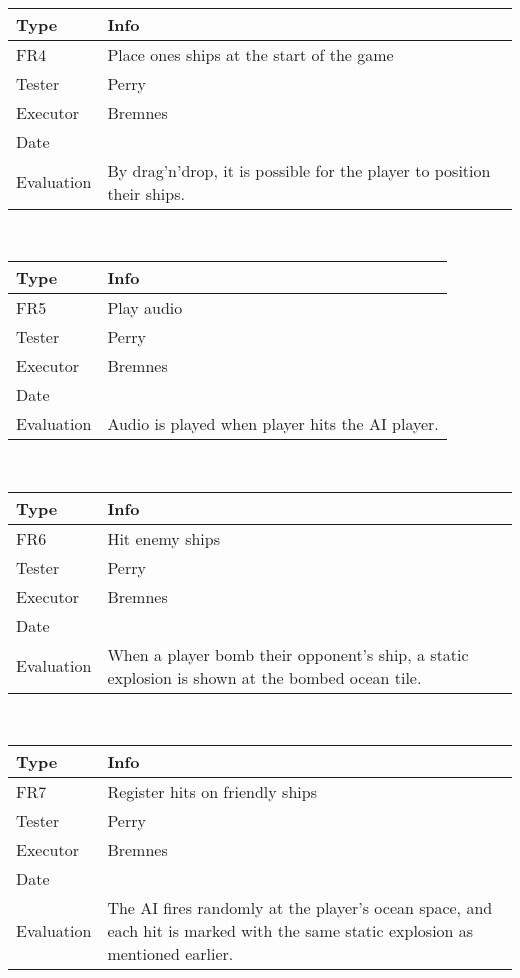 \\
\begin{tabular}{|l|l|}
	\hline
	\bf{Type}	& \bf{Info} \\
	\hline
	FR4			& Place ones ships at the start of the game \\
	Tester		& Perry \\
	Executor	& Bremnes \\
	Date		& \date{\today} \\
	Evaluation	& By drag'n'drop, it is possible for the player to position their ships. \\
	\hline
\end{tabular}
\\
\begin{tabular}{|l|l|}
	\hline
	\bf{Type}	& \bf{Info} \\
	\hline
	FR5			& Play audio \\
	Tester		& Perry \\
	Executor	& Bremnes \\
	Date		& \date{\today} \\
	Evaluation	& Audio is played when player hits the AI player. \\
	\hline
\end{tabular}
\\
\begin{tabular}{|l|l|}
	\hline
	\bf{Type}	& \bf{Info} \\
	\hline
	FR6			& Hit enemy ships \\
	Tester		& Perry \\
	Executor	& Bremnes \\
	Date		& \date{\today} \\
	Evaluation	& When a player bomb their opponent's ship, a static explosion is shown at the bombed ocean tile. \\
	\hline
\end{tabular}
\\
\begin{tabular}{|l|l|}
	\hline
	\bf{Type}	& \bf{Info} \\
	\hline
	FR7			& Register hits on friendly ships \\
	Tester		& Perry \\
	Executor	& Bremnes \\
	Date		& \date{\today} \\
	Evaluation	& The AI fires randomly at the player's ocean space, and each hit is marked with the same static explosion as mentioned earlier. \\
	\hline
\end{tabular}
\\


